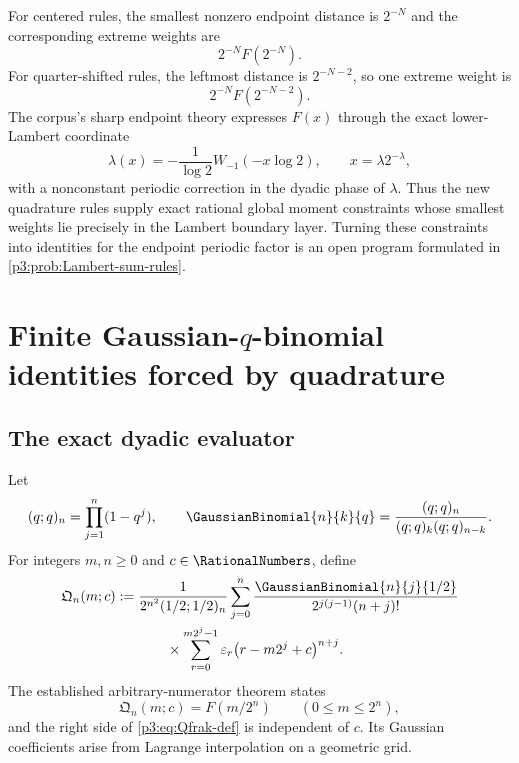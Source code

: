 \documentclass[11pt,oneside]{article}
\numberwithin{equation}{section}
\theoremstyle{definition}
\theoremstyle{remark}
\newcommand{\eps}{\varepsilon}
\begin{document}
For centered rules, the smallest nonzero endpoint distance is $2^{-N}$ and the corresponding extreme weights are
\begin{equation}
 2^{-N}F(2^{-N}).
 \label{p3:eq:centered-extreme-weight}
\end{equation}
For quarter-shifted rules, the leftmost distance is $2^{-N-2}$, so one extreme weight is
\begin{equation}
 2^{-N}F(2^{-N-2}).
 \label{p3:eq:quarter-extreme-weight}
\end{equation}
The corpus's sharp endpoint theory expresses $F(x)$ through the exact lower-Lambert coordinate
\begin{equation}
 \lambda(x)=-\frac1{\log2}W_{-1}(-x\log2),
 \qquad x=\lambda2^{-\lambda},
 \label{p3:eq:Lambert-coordinate}
\end{equation}
with a nonconstant periodic correction in the dyadic phase of $\lambda$.  Thus the new quadrature rules supply exact rational global moment constraints whose smallest weights lie precisely in the Lambert boundary layer.  Turning these constraints into identities for the endpoint periodic factor is an open program formulated in \cref{p3:prob:Lambert-sum-rules}.

\section{Finite Gaussian-$q$-binomial identities forced by quadrature}
\label{p3:sec:qbinomial}

\subsection{The exact dyadic evaluator}

Let
\begin{equation}
 (q;q)_n=\prod_{j=1}^{n}(1-q^j),
 \qquad
 \GaussianBinomial{n}{k}{q}=\frac{(q;q)_n}{(q;q)_k(q;q)_{n-k}}.
 \label{p3:eq:q-notation-report}
\end{equation}
For integers $m,n\ge0$ and $c\in\RationalNumbers$, define
\begin{equation}
\begin{aligned}
 \mathfrak Q_n(m;c)
 :={}&\frac{1}{2^{n^2}(1/2;1/2)_n}
 \sum_{j=0}^{n}
 \frac{\GaussianBinomial{n}{j}{1/2}}
      {2^{j(j-1)}(n+j)!}\\
 &\qquad\times
 \sum_{r=0}^{m2^j-1}\eps_r
 \bigl(r-m2^j+c\bigr)^{n+j}.
 \label{p3:eq:Qfrak-def}
\end{aligned}
\end{equation}
The established arbitrary-numerator theorem states
\begin{equation}
 \mathfrak Q_n(m;c)=F(m/2^n)
 \qquad(0\le m\le2^n),
 \label{p3:eq:Qfrak-F}
\end{equation}
and the right side of \eqref{p3:eq:Qfrak-def} is independent of $c$.  Its Gaussian coefficients arise from Lagrange interpolation on a geometric grid.
\end{document}
